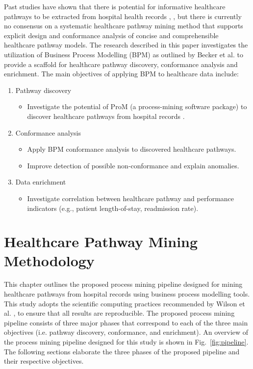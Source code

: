 Past studies have shown that there is potential for informative healthcare pathways to be extracted from hospital health records \cite{Xu2017}, \cite{Iwata2013}, but there is currently no consensus on a systematic healthcare pathway mining method that supports explicit design and conformance analysis of concise and comprehensible healthcare pathway models. The research described in this paper investigates the utilization of Business Process Modelling (BPM) as outlined by Becker et al. \cite{Becker2000} to provide a scaffold for healthcare pathway discovery, conformance analysis and enrichment. The main objectives of applying BPM to healthcare data include:
\begin{enumerate}
    \item Pathway discovery
    \begin{itemize}
        \item Investigate the potential of ProM (a process-mining software package) to discover healthcare pathways from hospital records \cite{VanDongen2005}.
    \end{itemize}
    \item Conformance analysis
    \begin{itemize}
        \item Apply BPM conformance analysis to discovered healthcare pathways. 
        \item Improve detection of possible non-conformance and explain anomalies.
    \end{itemize}
    \item Data enrichment
    \begin{itemize}
        \item Investigate correlation between healthcare pathway and performance indicators (e.g., patient length-of-stay, readmission rate).
    \end{itemize}
\end{enumerate}

\section{Healthcare Pathway Mining Methodology}
This chapter outlines the proposed process mining pipeline designed for mining healthcare pathways from hospital records using business process modelling tools. This study adopts the scientific computing practices recommended by Wilson et al. \cite{Wilson2014}, \cite{Wilson2017} to ensure that all results are reproducible. The proposed process mining pipeline consists of three major phases that correspond to each of the three main objectives (i.e. pathway discovery, conformance, and enrichment). An overview of the process mining pipeline designed for this study is shown in Fig.~\ref{fig:pipeline}.  The following sections elaborate the three phases of the proposed pipeline and their respective objectives.

